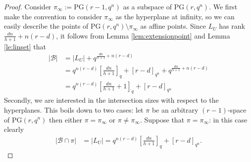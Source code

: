 \documentclass[11pt]{amsart}
\newcommand{\F}{{\mathbb F}}
\newcommand{\PG}{\mathrm{PG}}
\begin{document}
\begin{proof}
Consider $\pi_\infty:=\PG(r-1,q^n)$ as a subspace of $\PG(r,q^n)$. 
We first make the convention to consider $\pi_\infty$ as the hyperplane at infinity, so we can easily describe the points of $\PG(r,q^n)\setminus \pi_\infty$ as affine points.
Since $L_{U}$ has rank $\frac{dn}{h+1}+n(r-d)$, it follows from Lemma \ref{lem:extensionpoint} and Lemma \ref{le:linset} that %
\begin{equation*}
    \begin{split}
        \lvert\mathcal{B}\rvert&=\lvert L_U\rvert+q^{\frac{dn}{h+1}+n(r-d)}\\
        &=q^{n(r-d)}\left[\frac{dn}{h+1}\right]_q+[r-d]_{q^n}+q^{\frac{dn}{h+1}+n(r-d)}\\
        &=q^{n(r-d)}\left[\frac{dn}{h+1}+1\right]_q+[r-d]_{q^n}
    \end{split}
\end{equation*}
Secondly, we are interested in the intersection sizes with respect to the hyperplanes. This boils down to two cases: let $\pi$ be an arbitrary $(r-1)$-space of $\PG(r,q^n)$ then either $\pi=\pi_{\infty}$ or $\pi\ne\pi_{\infty}$. Suppose that $\pi=\pi_\infty$: in this case clearly
    \begin{equation*}
        \begin{split}
            \lvert \mathcal{B} \cap \pi \rvert &= \lvert L_U \rvert= q^{n(r-d)}\left[\frac{dn}{h+1}\right]_q+[r-d]_{q^n}.
        \end{split}
    \end{equation*}

\end{proof}
\end{document}
